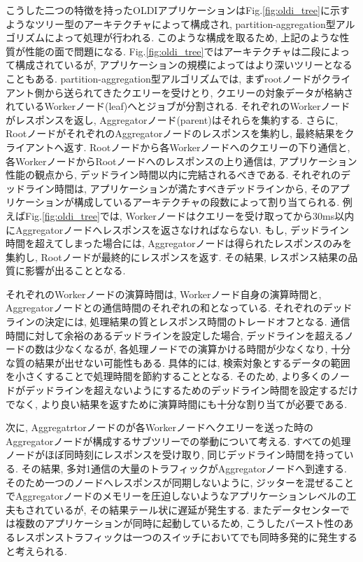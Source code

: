 こうした二つの特徴を持ったOLDIアプリケーションはFig.\ref{fig:oldi_tree}に示すようなツリー型のアーキテクチャによって構成され,
partition-aggregation型アルゴリズムによって処理が行われる. 
このような構成を取るため, 上記のような性質が性能の面で問題になる.\cite{websearch} 
Fig.\ref{fig:oldi_tree}ではアーキテクチャは二段によって構成されているが,
アプリケーションの規模によってはより深いツリーとなることもある. 
partition-aggregation型アルゴリズムでは, まずrootノードがクライアント側から送られてきたクエリーを受けとり,
クエリーの対象データが格納されているWorkerノード(leaf)へとジョブが分割される. 
それぞれのWorkerノードがレスポンスを返し, Aggregatorノード(parent)はそれらを集約する. 
さらに, RootノードがそれぞれのAggregatorノードのレスポンスを集約し, 最終結果をクライアントへ返す. 
Rootノードから各Workerノードへのクエリーの下り通信と, 各WorkerノードからRootノードへのレスポンスの上り通信は,
アプリケーション性能の観点から, デッドライン時間以内に完結されるべきである. 
それぞれのデッドライン時間は, アプリケーションが満たすべきデッドラインから, そのアプリケーションが構成しているアーキテクチャの段数によって割り当てられる. 
例えばFig.\ref{fig:oldi_tree}では,
Workerノードはクエリーを受け取ってから30ms以内にAggregatorノードへレスポンスを返さなければならない. 
もし, デッドライン時間を超えてしまった場合には, Aggregatorノードは得られたレスポンスのみを集約し, Rootノードが最終的にレスポンスを返す. 
その結果, レスポンス結果の品質に影響が出ることとなる. 

それぞれのWorkerノードの演算時間は,  Workerノード自身の演算時間と, Aggregatorノードとの通信時間のそれぞれの和となっている. 
それぞれのデッドラインの決定には, 処理結果の質とレスポンス時間のトレードオフとなる. 
通信時間に対して余裕のあるデッドラインを設定した場合, デッドラインを超えるノードの数は少なくなるが, 各処理ノードでの演算かける時間が少なくなり,
十分な質の結果が出せない可能性もある. 
具体的には, 検索対象とするデータの範囲を小さくすることで処理時間を節約することとなる. 
そのため,  より多くのノードがデッドラインを超えないようにするためのデッドライン時間を設定するだけでなく,
より良い結果を返すために演算時間にも十分な割り当てが必要である.\cite{d2tcp} 

次に, Aggregatrtorノードのが各Workerノードへクエリーを送った時のAggregatorノードが構成するサブツリーでの挙動について考える. 
すべての処理ノードがほぼ同時刻にレスポンスを受け取り, 同じデッドライン時間を持っている. 
その結果, 多対1通信の大量のトラフィックがAggregatorノードへ到達する\cite{dctcp, incast}. 
そのため一つのノードへレスポンスが同期しないように,
ジッターを混ぜることでAggregatorノードのメモリーを圧迫しないようなアプリケーションレベルの工夫もされているが,
その結果テール状に遅延が発生する\cite{desynchro}.
またデータセンターでは複数のアプリケーションが同時に起動しているため,
こうしたバースト性のあるレスポンストラフィックは一つのスイッチにおいてでも同時多発的に発生すると考えられる.

